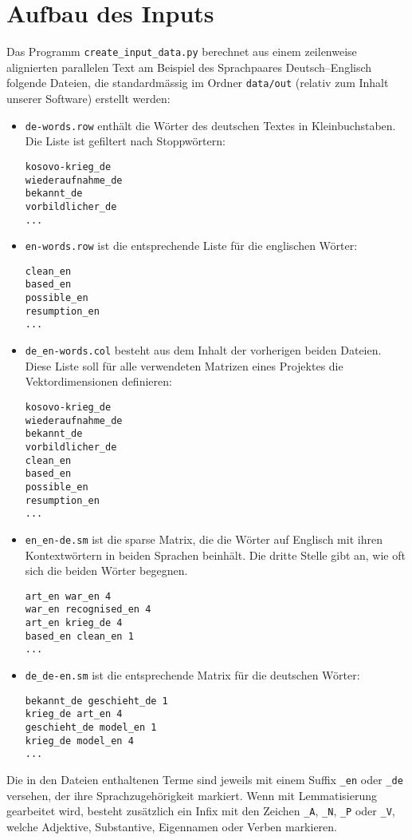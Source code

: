 \documentclass[11pt,twoside,openright]{mpreport}
\begin{document}
\section{Aufbau des Inputs}
\label{sec:input}
Das Programm \verb+create_input_data.py+ berechnet aus einem zeilenweise alignierten parallelen Text am Beispiel des Sprachpaares Deutsch--Englisch folgende Dateien, die standardmässig im Ordner \verb+data/out+ (relativ zum Inhalt unserer Software) erstellt werden:
\begin{itemize}
\item \verb+de-words.row+ enthält die Wörter des deutschen Textes in Kleinbuchstaben. Die Liste ist gefiltert nach Stoppwörtern:
\begin{verbatim}
kosovo-krieg_de
wiederaufnahme_de
bekannt_de
vorbildlicher_de
...
\end{verbatim}
\item \verb+en-words.row+ ist die entsprechende Liste für die englischen Wörter:
\begin{verbatim}
clean_en
based_en
possible_en
resumption_en
...
\end{verbatim}
\item \verb+de_en-words.col+ besteht aus dem Inhalt der vorherigen beiden Dateien. Diese Liste soll für alle verwendeten Matrizen eines Projektes die Vektordimensionen definieren:
\begin{verbatim}
kosovo-krieg_de
wiederaufnahme_de
bekannt_de
vorbildlicher_de
clean_en
based_en
possible_en
resumption_en
...
\end{verbatim}
\item \verb+en_en-de.sm+ ist die sparse Matrix, die die Wörter auf Englisch mit ihren Kontextwörtern in beiden Sprachen beinhält. Die dritte Stelle gibt an, wie oft sich die beiden Wörter begegnen. 
\begin{verbatim}
art_en war_en 4
war_en recognised_en 4
art_en krieg_de 4
based_en clean_en 1
...
\end{verbatim}
\item \verb+de_de-en.sm+ ist die entsprechende Matrix für die deutschen Wörter:
\begin{verbatim}
bekannt_de geschieht_de 1
krieg_de art_en 4
geschieht_de model_en 1
krieg_de model_en 4
...
\end{verbatim}
\end{itemize}
Die in den Dateien enthaltenen Terme sind jeweils mit einem Suffix \verb+_en+ oder \verb+_de+ versehen, der ihre Sprachzugehörigkeit markiert. Wenn mit
Lemmatisierung gearbeitet wird, besteht zusätzlich ein Infix mit den Zeichen \verb+_A+, \verb+_N+, \verb+_P+ oder \verb+_V+, welche Adjektive, Substantive,
Eigennamen oder Verben markieren.
\end{document}
